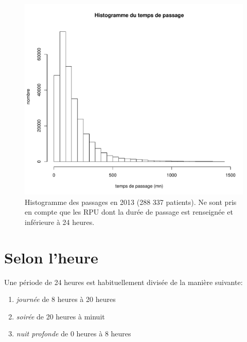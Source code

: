 \documentclass[12pt,english,french,twoside]{book}\usepackage[]{graphicx}\usepackage[]{color}
\makeatletter
\def\maxwidth{ %
  \ifdim\Gin@nat@width>\linewidth
    \linewidth
  \else
    \Gin@nat@width
  \fi
}
\newenvironment{knitrout}{}{} %
\makeatother
\begin{document}
\begin{figure}[ht!]
 \centering
\begin{knitrout}
\color{fgcolor}
\includegraphics[width=\maxwidth]{figure/hist_tous_passages} 

\end{knitrout}

 \caption{Histogramme des passages en 2013 (288 337 patients). Ne sont pris en compte que les RPU dont la durée de passage est renseignée et inférieure à 24 heures.}
 \label{fig:hist_passages}
\end{figure}


\section{Selon l'heure}

Une période de 24 heures est habituellement divisée de la manière suivante:
\begin{enumerate}
  \item \emph{journée} de 8 heures à 20 heures
  \item \emph{soirée} de 20 heures à minuit
  \item  \emph{nuit profonde} de 0 heures à 8 heures
\end{enumerate}
\end{document}
